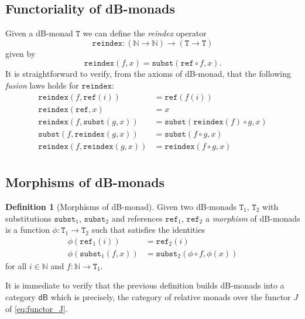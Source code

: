 \documentclass[a4paper,twoside,12pt]{article}
\theoremstyle{definition}
\newtheorem{definition}{Definition}
\theoremstyle{remark}
\newcommand{\NN}{\mathbb{N}}
\newcommand{\subst}{\mathtt{subst}}
\newcommand{\refe}{\mathtt{ref}}
\newcommand{\reindex}{\mathtt{reindex}}
\newcommand{\TT}{\mathtt{T}}
\begin{document}
\subsection{Functoriality of dB-monads}
\label{sec:further-operators-db}

Given a dB-monad $\TT$ we can define the \emph{reindex} operator
\begin{equation*}
  \reindex\colon (\NN \to \NN) \to (\TT \to \TT)
\end{equation*}
given by
\begin{equation*}
  \reindex(f,x) = \subst(\refe \circ f, x).
\end{equation*}
It is straightforward to verify, from the axioms of dB-monad, that the
following \emph{fusion} laws holds for $\reindex$:
\begin{align*}
  \reindex(f,\refe(i)) &= \refe(f(i)) \\
  \reindex(\refe,x) &= x \\
  \reindex(f,\subst(g,x)) &= \subst(\reindex(f) \circ g, x) \\
  \subst(f,\reindex(g,x)) &= \subst(f \circ g,x) \\
  \reindex(f,\reindex(g,x)) &= \reindex(f\circ g, x) \\
\end{align*}

\subsection{Morphisms of dB-monads}
\label{sec:morphisms-db-monads}

\begin{definition}[Morphisms of dB-monad]
  Given two dB-monads $\TT_1$, $\TT_2$ with substitutions $\subst_1$,
  $\subst_2$ and references $\refe_1$, $\refe_2$ a \emph{morphism} of
  dB-monads is a function $\phi\colon \TT_1 \to \TT_2$ such that
  satisfies the  identities
  \begin{align*}
    \phi(\refe_1(i)) &= \refe_2(i) \\
    \phi(\subst_1(f,x)) &= \subst_2(\phi \circ f, \phi(x))
  \end{align*}
  for all $i \in \NN$ and $f\colon \NN \to \TT_1$.
\end{definition}

It is immediate to verify that the previous definition builds
dB-monads into a category $\mathsf{dB}$ which is precisely, the
category of relative monads over the functor $J$ of
\eqref{eq:functor_J}.
\end{document}

